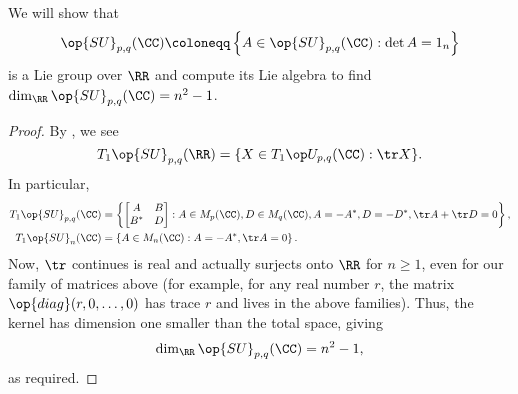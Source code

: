 \documentclass[../notes.tex]{subfiles}
\begin{document}
\begin{example} \label{ex:su}
	We will show that
	\[\op{SU}_{p,q}(\CC)\coloneqq\left\{A\in\op{SU}_{p,q}(\CC):\det A=1_n\right\}\]
	is a Lie group over $\RR$ and compute its Lie algebra to find $\dim_\RR\op{SU}_{p,q}(\CC)=n^2-1$.
\end{example}
\begin{proof}
	By , we see
	\[T_1\op{SU}_{p,q}(\RR)=\{X\in T_1\op U_{p,q}(\CC):\tr X\}.\]
	In particular,
	\begin{align*}
		T_1\op{SU}_{p,q}(\CC) &= \left\{\begin{bmatrix}
			A & B \\ B^* & D
		\end{bmatrix}:A\in M_p(\CC),D\in M_q(\CC),A=-A^*,D=-D^*,\tr A+\tr D=0\right\}, \\
		T_1\op{SU}_n(\CC) &= \left\{A\in M_n(\CC):A=-A^*,\tr A=0\right\}.
	\end{align*}
	Now, $\tr$ continues is real and actually surjects onto $\RR$ for $n\ge1$, even for our family of matrices above (for example, for any real number $r$, the matrix $\op{diag}(r,0,\ldots,0)$ has trace $r$ and lives in the above families). Thus, the kernel has dimension one smaller than the total space, giving
	\[\dim_\RR\op{SU}_{p,q}(\CC) = n^2-1,\]
	as required.
\end{proof}
\end{document}
